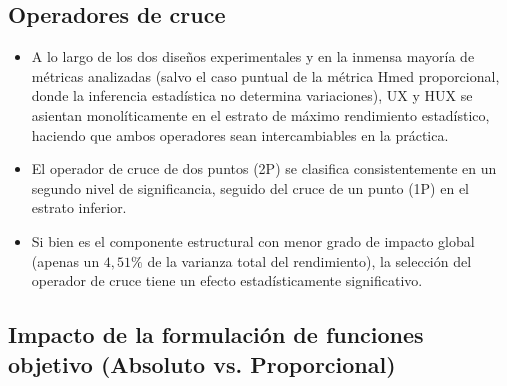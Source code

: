 \subsection{Operadores de cruce}

\begin{itemize}
    \item A lo largo de los dos diseños experimentales y en la inmensa mayoría de métricas analizadas (salvo el caso puntual de la métrica Hmed proporcional, donde la inferencia estadística no determina variaciones), UX y HUX se asientan monolíticamente en el estrato de máximo rendimiento estadístico, haciendo que ambos operadores sean intercambiables en la práctica.
    \item El operador de cruce de dos puntos (2P) se clasifica consistentemente en un segundo nivel de significancia, seguido del cruce de un punto (1P) en el estrato inferior.
    \item Si bien es el componente estructural con menor grado de impacto global (apenas un $4{,}51\%$ de la varianza total del rendimiento), la selección del operador de cruce tiene un efecto estadísticamente significativo.
\end{itemize}


\subsection{Impacto de la formulación de funciones objetivo (Absoluto vs. Proporcional)}

